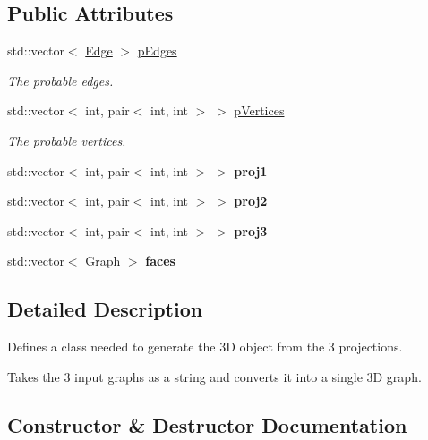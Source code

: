 \subsection*{Public Attributes}
\begin{DoxyCompactItemize}
\item 
std\+::vector$<$ \mbox{\hyperlink{struct_edge}{Edge}} $>$ \mbox{\hyperlink{classtwoto3d_a8ccf9fe8716e71f2a7d8e44760616fa1}{p\+Edges}}
\begin{DoxyCompactList}\small\item\em The probable edges. \end{DoxyCompactList}\item 
std\+::vector$<$ int, pair$<$ int, int $>$ $>$ \mbox{\hyperlink{classtwoto3d_a03217e7090aa50fa3d6fa1ac09f104e6}{p\+Vertices}}
\begin{DoxyCompactList}\small\item\em The probable vertices. \end{DoxyCompactList}\item 
\mbox{\label{classtwoto3d_a37d2112519af172a2d76b71d3e5b17b4}} 
std\+::vector$<$ int, pair$<$ int, int $>$ $>$ {\bfseries proj1}
\item 
\mbox{\label{classtwoto3d_a640d3bcfcc52d7030e2c93124b3f064b}} 
std\+::vector$<$ int, pair$<$ int, int $>$ $>$ {\bfseries proj2}
\item 
\mbox{\label{classtwoto3d_a39682f28b1b1b870a721194cce90ef9e}} 
std\+::vector$<$ int, pair$<$ int, int $>$ $>$ {\bfseries proj3}
\item 
\mbox{\label{classtwoto3d_a6ccb6e440032c79d7ee780bdb10c845d}} 
std\+::vector$<$ \mbox{\hyperlink{class_graph}{Graph}} $>$ {\bfseries faces}
\end{DoxyCompactItemize}


\subsection{Detailed Description}
Defines a class needed to generate the 3D object from the 3 projections. 

Takes the 3 input graphs as a string and converts it into a single 3D graph. 

\subsection{Constructor \& Destructor Documentation}
\mbox{\label{classtwoto3d_a22a5092922477075c8676947551e9476}} 
